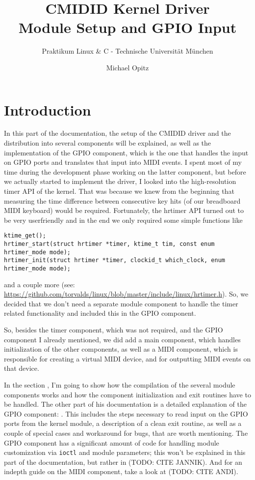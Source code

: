 \documentclass[paper=a4,fontsize=11pt,twocolumn,pagesize,bibtotoc]{scrartcl}
\title{CMIDID Kernel Driver\\Module Setup and GPIO Input}
\subtitle{Praktikum Linux \& C - Technische Universität München}
\author{Michael Opitz}
\begin{document}
\maketitle

\section{Introduction}
\label{michael:introduction}

In this part of the documentation, the setup of the CMIDID driver and the 
distribution into several components will be explained, as well as the 
implementation of the GPIO component, which is the one that handles the input 
on GPIO ports and translates that input into MIDI events.
I spent most of my time during the 
development phase working on the latter component, but before we actually 
started to implement the driver, I looked into the high-resolution timer API 
of the kernel. That was because we knew from the beginning that measuring the 
time difference between consecutive key hits (of our breadboard MIDI keyboard) 
would be required. Fortunately, the hrtimer API turned out to be very 
userfriendly and in the end we only required some simple functions like 
\begin{lstlisting}
ktime_get();
hrtimer_start(struct hrtimer *timer, ktime_t tim, const enum hrtimer_mode mode);
hrtimer_init(struct hrtimer *timer, clockid_t which_clock, enum hrtimer_mode mode);
\end{lstlisting}
and a couple more (see: \url{https://github.com/torvalds/linux/blob/master/include/linux/hrtimer.h}).
So, we decided that we don't need a separate module 
component to handle the timer related functionality and included this in the 
GPIO component.

So, besides the timer component, which was not required, and the GPIO 
component I already mentioned, we did add a main component, which handles 
initialization of the other components, as well as a MIDI component, which is 
responsible for creating a virtual MIDI device, and for outputting MIDI 
events on that device.

In the section \textbf{}, I'm going to show how the compilation of 
the several module components works and how the component initialization and 
exit routines have to be handled. The other part of his documentation is 
a detailed explanation of the GPIO component: \textbf{}. This 
includes the steps necessary to read input on the GPIO ports from the kernel 
module, a description of a clean exit routine, as well as a couple of special 
cases and workaround for bugs, that are worth mentioning. The GPIO component 
has a significant amount of code for handling module customization via 
\texttt{ioctl} and module parameters; this won't be explained in this part of 
the documentation, but rather in (TODO: CITE JANNIK). And for an indepth guide 
on the MIDI component, take a look at (TODO: CITE ANDI).
\end{document}
